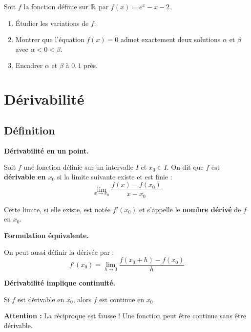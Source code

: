 \documentclass[../PolyS2.tex]{subfiles}
\begin{document}

Soit $f$ la fonction définie sur $\mathbb{R}$ par $f(x) = e^x - x - 2$.
\begin{enumerate}
    \item Étudier les variations de $f$.
    \item Montrer que l'équation $f(x) = 0$ admet exactement deux solutions $\alpha$ et $\beta$ avec $\alpha < 0 < \beta$.
    \item Encadrer $\alpha$ et $\beta$ à $0{,}1$ près.
\end{enumerate}


\newpage
\section{Dérivabilité}

\subsection{Définition}

\begin{Def}
\textbf{Dérivabilité en un point.}

Soit $f$ une fonction définie sur un intervalle $I$ et $x_0 \in I$. On dit que $f$ est \textbf{dérivable en $x_0$} si la limite suivante existe et est finie :
$$\lim_{x \to x_0} \frac{f(x) - f(x_0)}{x - x_0}$$

Cette limite, si elle existe, est notée $f'(x_0)$ et s'appelle le \textbf{nombre dérivé} de $f$ en $x_0$.
\end{Def}

\begin{Prop}
\textbf{Formulation équivalente.}

On peut aussi définir la dérivée par :
$$f'(x_0) = \lim_{h \to 0} \frac{f(x_0 + h) - f(x_0)}{h}$$
\end{Prop}

\begin{Thm}
\textbf{Dérivabilité implique continuité.}

Si $f$ est dérivable en $x_0$, alors $f$ est continue en $x_0$.

\vspace{1em}

\textbf{Attention :} La réciproque est fausse ! Une fonction peut être continue sans être dérivable.
\end{Thm}
\end{document}
